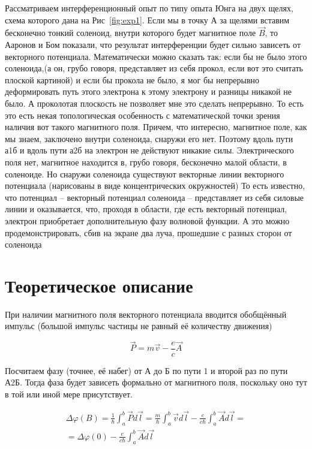 \documentclass[a4paper, 14pt]{article}
\begin{document}
    Рассматриваем интерференционный опыт по типу опыта Юнга на двух щелях, схема которого дана на Рис~\ref{fig:exp1}.
    Если мы в точку А за щелями вставим бесконечно тонкий соленоид, внутри которого будет магнитное поле $\vec{B}$,
    то Ааронов и Бом показали, что результат интерференции будет сильно зависеть от векторного потенциала.
    Математически можно сказать так: если бы не было этого соленоида,(а он, грубо говоря, представляет из себя
    прокол, если вот это считать плоской картиной) и если бы прокола не было, я мог бы непрерывно деформировать путь
    этого электрона к этому электрону и разницы никакой не было.
    А проколотая плоскость не позволяет мне это сделать непрерывно.
    То есть это есть некая топологическая особенность с математической точки зрения наличия вот такого магнитного поля.
    Причем, что интересно, магнитное поле, как мы знаем, заключено внутри соленоида, снаружи его нет.
    Поэтому вдоль пути а1б и вдоль пути а2б на электрон не действуют никакие силы.
    Электрического поля нет, магнитное находится в, грубо говоря, бесконечно малой области, в соленоиде.
    Но снаружи соленоида существуют векторные линии векторного потенциала (нарисованы в виде концентрических
    окружностей)
    То есть известно, что потенциал -- векторный потенциал соленоида -- представляет из себя силовые линии и
    оказывается, что, проходя в области, где есть векторный потенциал, электрон приобретает дополнительную фазу
    волновой функции.
    А это можно продемонстрировать, сбив на экране два луча, прошедшие с разных сторон от соленоида
    
    \section*{Теоретическое описание} 
    
    При наличии магнитного поля векторного потенциала вводится обобщённый импульс (большой импульс частицы не равный
    её количеству движения)
    
    \[ \vec{P} = m \vec{v} - \frac{e}{c} \vec{A} \]
    
    Посчитаем фазу (точнее, её набег) от А до Б по пути 1 и второй раз по пути А2Б.
    Тогда фаза будет зависеть формально от магнитного поля, поскольку оно тут в той или иной мере присутствует.
    
    \begin{gather}
        \Delta \varphi(B) = \frac{1}{\hbar} \int_a^b \vec{P} d \vec{l} = \frac{m}{\hbar} \int_a^b \vec{v} d \vec{l} -
        \frac{e}{c \hbar} \int_a^b \vec{A} d \vec{l} = \\
        = \Delta \varphi(0) - \frac{e}{c \hbar} \int_a^b \vec{A} d \vec{l}
    \end{gather}
    
\end{document}
